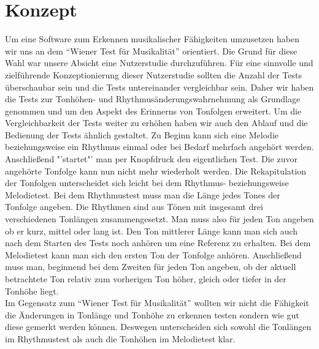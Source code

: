 \documentclass{acm_proc_article-sp}
\begin{document}
\section{Konzept}
Um eine Software zum Erkennen musikalischer Fähigkeiten umzusetzen haben wir uns an dem "`Wiener Test für Musikalität"' orientiert.
Die Grund für diese Wahl war unsere Absicht eine Nutzerstudie durchzuführen. Für eine sinnvolle und zielführende Konzeptionierung dieser Nutzerstudie sollten die Anzahl der Tests überschaubar sein und die Tests untereinander vergleichbar sein.
Daher wir haben die Tests zur Tonhöhen- und Rhythmusänderungswahrnehmung als Grundlage genommen und um den Aspekt des Erinnerns von Tonfolgen erweitert.
Um die Vergleichbarkeit der Tests weiter zu erhöhen haben wir auch den Ablauf und die Bedienung der Tests ähnlich gestaltet.
Zu Beginn kann sich eine Melodie beziehungsweise ein Rhythmus einmal oder bei Bedarf mehrfach angehört werden. Anschließend "'startet"' man per Knopfdruck den eigentlichen Test. Die zuvor angehörte Tonfolge kann nun nicht mehr wiederholt werden. Die Rekapitulation der Tonfolgen unterscheidet sich leicht bei dem Rhythmus- beziehungsweise Melodietest. Bei dem Rhythmustest muss man die Länge jedes Tones der Tonfolge angeben. Die Rhythmen sind aus Tönen mit insgesamt drei verschiedenen Tonlängen zusammengesetzt. Man muss also für jeden Ton angeben ob er kurz, mittel oder lang ist. Den Ton mittlerer Länge kann man sich auch nach dem Starten des Tests noch anhören um eine Referenz zu erhalten.
Bei dem Melodietest kann man sich den ersten Ton der Tonfolge anhören. Anschließend muss man, beginnend bei dem Zweiten für jeden Ton angeben, ob der aktuell betrachtete Ton relativ zum vorherigen Ton höher, gleich oder tiefer in der Tonhöhe liegt.\\ 
Im Gegensatz zum "`Wiener Test für Musikalität"' wollten wir nicht die Fähigkeit die Änderungen in Tonlänge und Tonhöhe zu erkennen testen sondern wie gut diese gemerkt werden können. Deswegen unterscheiden sich sowohl die Tonlängen im Rhythmustest als auch die Tonhöhen im Melodietest klar.
\end{document}
